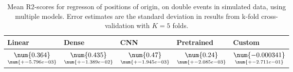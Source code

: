 \begin{table}
\centering
\caption{
Mean R2-scores for regresson of positions of origin, on double events in simulated data, using multiple models. 
Error estimates are the standard deviation in results from k-fold cross-validation 
with $K=5$ folds.
}
\label{tab:regression-simulated-double-position-r2}
\begin{tabular}{lllll}
\toprule
                                             Linear &                                               Dense &                                                CNN &                                         Pretrained &                                                  Custom \\
\midrule
 $\underset{\num{+- 5.796e-03 }  }{\num{ 0.364 } }$ &  $\underset{\num{+- 1.389e-02 }  }{\num{ 0.435 } }$ &  $\underset{\num{+- 1.945e-03 }  }{\num{ 0.47 } }$ &  $\underset{\num{+- 2.085e-03 }  }{\num{ 0.24 } }$ &  $\underset{\num{+- 2.711e-01 }  }{\num{ -0.000341 } }$ \\
\bottomrule
\end{tabular}
\end{table}

